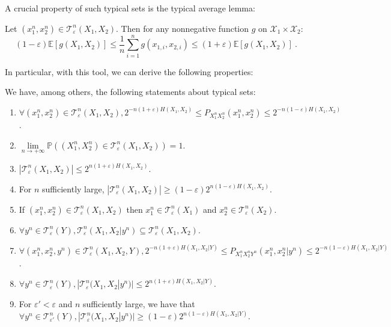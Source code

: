       A crucial property of such typical sets is the typical average lemma:

      \begin{lemma}
        Let $(x_1^n,x_2^n) \in \mathcal{T}^n_{\varepsilon}(X_1,X_2)$. Then for any nonnegative function $g$ on $\mathcal{X}_1\times\mathcal{X}_2$:
        \[ (1-\varepsilon)\mathbb{E}[g(X_1,X_2)] \leq \frac{1}{n}\sum_{i=1}^ng(x_{1,i},x_{2,i}) \leq (1+\varepsilon)\mathbb{E}[g(X_1,X_2)] \ . \]
      \end{lemma}
      
      In particular, with this tool, we can derive the following properties:
      
      \begin{proposition}
        We have, among others, the following statements about typical sets:
        \begin{enumerate}
        \item $\forall (x_1^n,x_2^n) \in \mathcal{T}^n_{\varepsilon}(X_1,X_2), 2^{-n(1+\varepsilon)H(X_1,X_2)} \leq P_{X_1^nX_2^n}(x_1^n,x_2^n) \leq 2^{-n(1-\varepsilon)H(X_1,X_2)}$.
        \item $\underset{n \rightarrow +\infty}{\lim} \mathbb{P}\left((X_1^n,X_2^n) \in \mathcal{T}^n_{\varepsilon}(X_1,X_2) \right) = 1$.
        \item $|\mathcal{T}^n_{\varepsilon}(X_1,X_2)| \leq 2^{n(1+\varepsilon)H(X_1,X_2)}$.
        \item For $n$ sufficiently large, $|\mathcal{T}^n_{\varepsilon}(X_1,X_2)| \geq (1-\varepsilon)2^{n(1-\varepsilon)H(X_1,X_2)}$.
        \item If $(x_1^n,x_2^n) \in \mathcal{T}^n_{\varepsilon}(X_1,X_2)$ then $x_1^n \in \mathcal{T}^n_{\varepsilon}(X_1)$ and $x_2^n \in \mathcal{T}^n_{\varepsilon}(X_2)$.
        \item $\forall y^n \in \mathcal{T}^n_{\varepsilon}(Y), \mathcal{T}^n_{\varepsilon}(X_1,X_2|y^n) \subseteq \mathcal{T}^n_{\varepsilon}(X_1,X_2)$.
        \item $\forall (x_1^n,x_2^n,y^n) \in \mathcal{T}^n_{\varepsilon}(X_1,X_2,Y), 2^{-n(1+\varepsilon)H(X_1,X_2|Y)} \leq P_{X_1^nX_2^nY^n}(x_1^n,x_2^n|y^n) \leq 2^{-n(1-\varepsilon)H(X_1,X_2|Y)}$.
        \item $\forall y^n \in \mathcal{T}^n_{\varepsilon}(Y), |\mathcal{T}^n_{\varepsilon}(X_1,X_2|y^n)| \leq 2^{n(1+\varepsilon)H(X_1,X_2|Y)}$.
        \item For $\varepsilon' < \varepsilon$ and $n$ sufficiently large, we have that $\forall y^n \in \mathcal{T}^n_{\varepsilon'}(Y), |\mathcal{T}^n_{\varepsilon}(X_1,X_2|y^n)| \geq (1-\varepsilon)2^{n(1-\varepsilon)H(X_1,X_2|Y)}$.
        \end{enumerate}
      \end{proposition}
